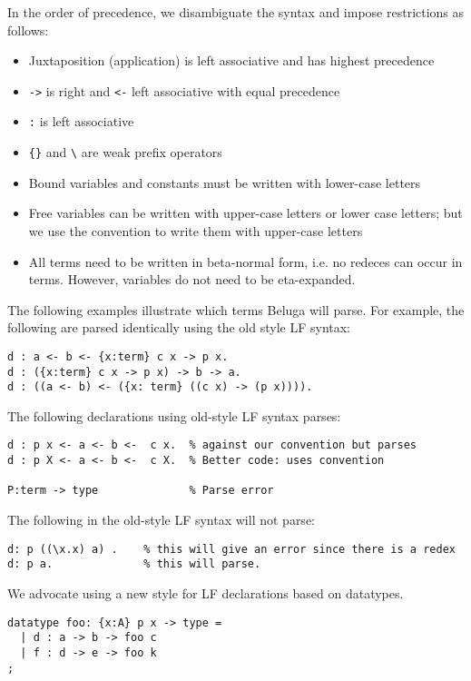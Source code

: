 \documentclass[11pt]{article}
\begin{document}
In the order of precedence, we disambiguate the syntax and impose restrictions as follows:
\begin{itemize}
\item Juxtaposition (application) is left associative and has highest precedence
\item\lstinline!->! is right and \lstinline!<-! left associative with equal precedence
\item\lstinline!:! is left associative
\item\lstinline!{}! and \lstinline!\! are weak prefix operators
\item Bound variables and constants must be written with lower-case letters
\item Free variables can be written with upper-case letters or lower case letters; but we use the convention to write them with upper-case letters
\item All terms need to be written in beta-normal form, i.e. no redeces can occur in terms.
However, variables do not need to be eta-expanded.
\end{itemize}
The following examples illustrate which terms Beluga will parse.
For example, the following are parsed identically using the old style LF syntax:

\begin{verbatim}
d : a <- b <- {x:term} c x -> p x.
d : ({x:term} c x -> p x) -> b -> a.
d : ((a <- b) <- ({x: term} ((c x) -> (p x)))).
\end{verbatim}


The following declarations using old-style LF syntax parses:
\begin{verbatim}
d : p x <- a <- b <-  c x.  % against our convention but parses
d : p X <- a <- b <-  c X.  % Better code: uses convention

P:term -> type              % Parse error
\end{verbatim}


The following in the old-style LF syntax will not parse:
\begin{verbatim}
d: p ((\x.x) a) .    % this will give an error since there is a redex
d: p a.              % this will parse.
\end{verbatim}


We advocate using a new style for LF declarations based on datatypes.

\begin{verbatim}
datatype foo: {x:A} p x -> type =
  | d : a -> b -> foo c
  | f : d -> e -> foo k
;
\end{verbatim}
\end{document}
